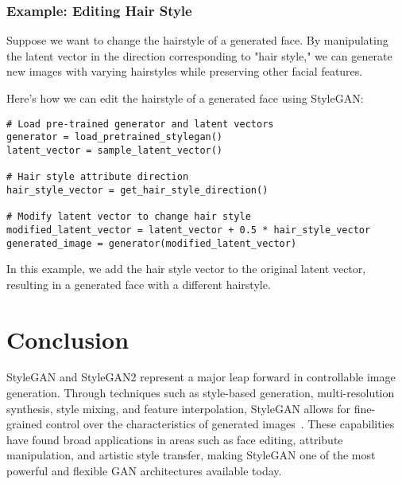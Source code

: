 \subsubsection{Example: Editing Hair Style}
Suppose we want to change the hairstyle of a generated face. By manipulating the latent vector in the direction corresponding to "hair style," we can generate new images with varying hairstyles while preserving other facial features.

Here's how we can edit the hairstyle of a generated face using StyleGAN:

\begin{lstlisting}[style=python]
# Load pre-trained generator and latent vectors
generator = load_pretrained_stylegan()
latent_vector = sample_latent_vector()

# Hair style attribute direction
hair_style_vector = get_hair_style_direction()

# Modify latent vector to change hair style
modified_latent_vector = latent_vector + 0.5 * hair_style_vector
generated_image = generator(modified_latent_vector)
\end{lstlisting}

In this example, we add the hair style vector to the original latent vector, resulting in a generated face with a different hairstyle.

\section{Conclusion}

StyleGAN and StyleGAN2 represent a major leap forward in controllable image generation. Through techniques such as style-based generation, multi-resolution synthesis, style mixing, and feature interpolation, StyleGAN allows for fine-grained control over the characteristics of generated images~\cite{karras2020analyzing}. These capabilities have found broad applications in areas such as face editing, attribute manipulation, and artistic style transfer, making StyleGAN one of the most powerful and flexible GAN architectures available today.
